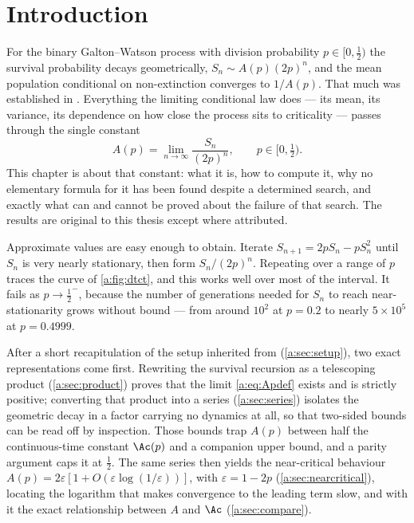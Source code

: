 \section{Introduction}
\label{a:sec:intro}

For the binary Galton--Watson process with division probability $p\in[0,\tfrac12)$
the survival probability decays geometrically, $S_n\sim A(p)(2p)^n$, and the mean
population conditional on non-extinction converges to $1/A(p)$. That much was
established in \ChM. Everything the limiting conditional law does --- its mean, its
variance, its dependence on how close the process sits to criticality --- passes
through the single constant
\begin{equation}
\label{a:eq:Apdef}
A(p) = \lim_{n\to\infty}\frac{S_n}{(2p)^n},
\qquad p\in[0,\tfrac12) .
\end{equation}
This chapter is about that constant: what it is, how to compute it, why no
elementary formula for it has been found despite a determined search, and exactly
what can and cannot be proved about the failure of that search. The results are
original to this thesis except where attributed.

Approximate values are easy enough to obtain. Iterate
$S_{n+1}=2pS_n-pS_n^2$ until $S_n$ is very nearly stationary, then form
$S_n/(2p)^n$. Repeating over a range of $p$ traces the curve of
\cref{a:fig:dtct}, and this works well over most of the interval. It fails as
$p\to\tfrac12^-$, because the number of generations needed for $S_n$ to reach
near-stationarity grows without bound --- from around $10^2$ at $p=0.2$ to nearly
$5\times10^5$ at $p=0.4999$.

After a short recapitulation of the setup inherited
from \ChM{} (\cref{a:sec:setup}), two exact representations come first. Rewriting
the survival recursion as a telescoping product (\cref{a:sec:product}) proves that
the limit \cref{a:eq:Apdef} exists and is strictly positive; converting that
product into a series (\cref{a:sec:series}) isolates the geometric decay in a
factor carrying no dynamics at all, so that two-sided bounds can be read off by
inspection. Those bounds trap $A(p)$ between half the continuous-time constant
$\Ac(p)$ and a companion upper bound, and a parity argument caps it at $\tfrac12$.
The same series then yields the near-critical behaviour
$A(p) = 2\varepsilon[1+O(\varepsilon\log(1/\varepsilon))]$, with
$\varepsilon = 1-2p$ (\cref{a:sec:nearcritical}), locating the logarithm that makes
convergence to the leading term slow, and with it the exact relationship between
$A$ and $\Ac$ (\cref{a:sec:compare}).

